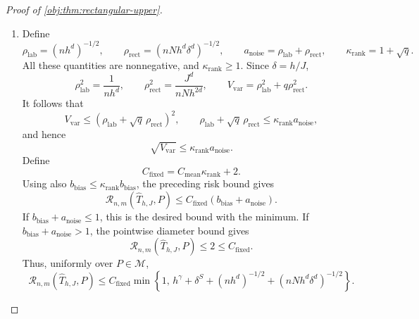 \begin{proof}[Proof of \cref{obj:thm:rectangular-upper}]
\begin{enumerate}
Define the variance scale by
\[
V_{\mathrm{var}}
=\frac1{nh^d}+\frac{qJ^d}{nNh^{2d}}.
\]
By \cref{obj:lem:rectangular-sampling-bound}, there is a uniform positive finite constant \(C_{\mathrm{samp}}\) such that
\[
\mathbb E_{\mathsf E_{n,m}(P)}Z_R
+\mathbb E_{\mathsf E_{n,m}(P)}Z_Q
\le C_{\mathrm{samp}}V_{\mathrm{var}}.
\]
Both deviations are nonnegative. Cauchy--Schwarz under the probability sampling law therefore gives
\[
\begin{aligned}
\mathbb E_{\mathsf E_{n,m}(P)}\sqrt{Z_R}
&\le
\sqrt{\mathbb E_{\mathsf E_{n,m}(P)}Z_R}
\le\sqrt{C_{\mathrm{samp}}}\sqrt{V_{\mathrm{var}}},\\
\mathbb E_{\mathsf E_{n,m}(P)}\sqrt{Z_Q}
&\le
\sqrt{\mathbb E_{\mathsf E_{n,m}(P)}Z_Q}
\le\sqrt{C_{\mathrm{samp}}}\sqrt{V_{\mathrm{var}}}.
\end{aligned}
\]
The decision and target both belong to \([-1,1]\), so their absolute difference is at most \(2\) and is integrable. Integrating the pointwise inequality and defining
\[
C_{\mathrm{mean}}
=\kappa_{\mathrm{mean}}(1+2\sqrt{C_{\mathrm{samp}}})
\]
proves
\[
\begin{aligned}
\mathcal R_{n,m}(\widehat T_{h,J},P)
&\le\kappa_{\mathrm{mean}}
 \left(b_{\mathrm{bias}}
       +2\sqrt{C_{\mathrm{samp}}}\sqrt{V_{\mathrm{var}}}\right)\\
&\le C_{\mathrm{mean}}
 (b_{\mathrm{bias}}+\sqrt{V_{\mathrm{var}}}).
\end{aligned}
\]%

\item Define
\[
\rho_{\mathrm{lab}}=(nh^d)^{-1/2},\qquad
\rho_{\mathrm{rect}}=(nNh^d\delta^d)^{-1/2},\qquad
a_{\mathrm{noise}}=\rho_{\mathrm{lab}}+\rho_{\mathrm{rect}},
\qquad
\kappa_{\mathrm{rank}}=1+\sqrt q.
\]
All these quantities are nonnegative, and
\(\kappa_{\mathrm{rank}}\ge1\). Since \(\delta=h/J\),
\[
\rho_{\mathrm{lab}}^2=\frac1{nh^d},\qquad
\rho_{\mathrm{rect}}^2
=\frac{J^d}{nNh^{2d}},\qquad
V_{\mathrm{var}}
=\rho_{\mathrm{lab}}^2+q\rho_{\mathrm{rect}}^2.
\]
It follows that
\[
V_{\mathrm{var}}
\le
(\rho_{\mathrm{lab}}+\sqrt q\,\rho_{\mathrm{rect}})^2,
\qquad
\rho_{\mathrm{lab}}+\sqrt q\,\rho_{\mathrm{rect}}
\le\kappa_{\mathrm{rank}}a_{\mathrm{noise}},
\]
and hence
\[
\sqrt{V_{\mathrm{var}}}
\le\kappa_{\mathrm{rank}}a_{\mathrm{noise}}.
\]
Define
\[
C_{\mathrm{fixed}}
=C_{\mathrm{mean}}\kappa_{\mathrm{rank}}+2.
\]
Using also
\(b_{\mathrm{bias}}\le\kappa_{\mathrm{rank}}b_{\mathrm{bias}}\), the preceding risk bound gives
\[
\mathcal R_{n,m}(\widehat T_{h,J},P)
\le C_{\mathrm{fixed}}
 (b_{\mathrm{bias}}+a_{\mathrm{noise}}).
\]
If \(b_{\mathrm{bias}}+a_{\mathrm{noise}}\le1\), this is the desired bound with the minimum. If
\(b_{\mathrm{bias}}+a_{\mathrm{noise}}>1\), the pointwise diameter bound gives
\[
\mathcal R_{n,m}(\widehat T_{h,J},P)
\le2\le C_{\mathrm{fixed}}.
\]
Thus, uniformly over \(P\in\mathcal M\),
\[
\mathcal R_{n,m}(\widehat T_{h,J},P)
\le C_{\mathrm{fixed}}
\min\left\{1,\,
h^\gamma+\delta^S+(nh^d)^{-1/2}
 +(nNh^d\delta^d)^{-1/2}\right\}.
\]%


\end{enumerate}
\end{proof}
